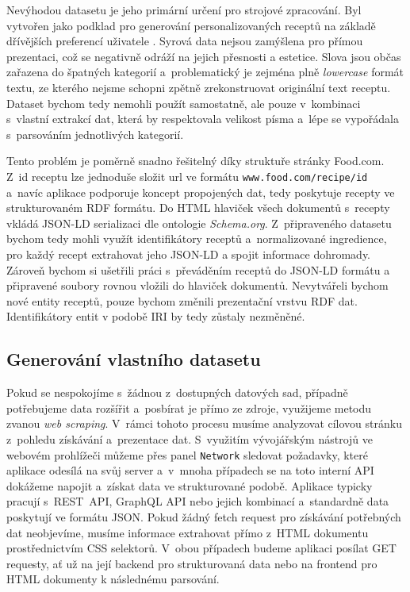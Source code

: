 Nevýhodou datasetu je jeho primární určení pro strojové zpracování. Byl vytvořen jako podklad pro generování personalizovaných receptů na základě dřívějších preferencí uživatele \citep{majumder-etal-2019-generating}. Syrová data nejsou zamýšlena pro přímou prezentaci, což se negativně odráží na jejich přesnosti a estetice. Slova jsou občas zařazena do špatných kategorií a~problematický je zejména plně \emph{lowercase} formát textu, ze kterého nejsme schopni zpětně zrekonstruovat originální text receptu. Dataset bychom tedy nemohli použít samostatně, ale pouze v~kombinaci s~vlastní extrakcí dat, která by respektovala velikost písma a~lépe se vypořádala s~parsováním jednotlivých kategorií.

Tento problém je poměrně snadno řešitelný díky struktuře stránky Food.com. Z~id receptu lze jednoduše složit url ve formátu \texttt{www.food.com/recipe/id} a~navíc aplikace podporuje koncept propojených dat, tedy poskytuje recepty ve strukturovaném RDF formátu. Do HTML hlaviček všech dokumentů s~recepty vkládá JSON-LD serializaci dle ontologie \emph{Schema.org}. Z~připraveného datasetu bychom tedy mohli využít identifikátory receptů a~normalizované ingredience, pro každý recept extrahovat jeho JSON-LD a spojit informace dohromady. Zároveň bychom si ušetřili práci s~převáděním receptů do JSON-LD formátu a připravené soubory rovnou vložili do hlaviček dokumentů. Nevytvářeli bychom nové entity receptů, pouze bychom změnili prezentační vrstvu RDF dat. Identifikátory entit v podobě IRI by tedy zůstaly nezměněné.

\subsection{Generování vlastního datasetu}

Pokud se nespokojíme s~žádnou z~dostupných datových sad, případně potřebujeme data rozšířit a~posbírat je přímo ze zdroje, využijeme metodu zvanou \emph{web scraping}. V~rámci tohoto procesu musíme analyzovat cílovou stránku z~pohledu získávání a~prezentace dat. S~využitím vývojářským nástrojů ve webovém prohlížeči můžeme přes panel \texttt{Network} sledovat požadavky, které aplikace odesílá na svůj server a~v~mnoha případech se na toto interní API dokážeme napojit a~získat data ve strukturované podobě. Aplikace typicky pracují s~REST~API, GraphQL API nebo jejich kombinací a~standardně data poskytují ve formátu JSON. Pokud žádný fetch request pro získávání potřebných dat neobjevíme, musíme informace extrahovat přímo z~HTML dokumentu prostřednictvím CSS selektorů. V~obou případech budeme aplikaci posílat GET requesty, ať už na její backend pro strukturovaná data nebo na frontend pro HTML dokumenty k následnému parsování.

